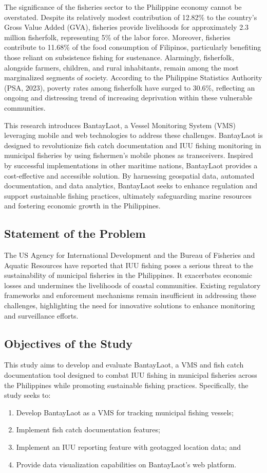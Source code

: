 \documentclass[journal]{IEEEtran}
\begin{document}
The significance of the fisheries sector to the Philippine economy cannot be overstated. Despite its relatively modest contribution of 12.82\% to the country's Gross Value Added (GVA), fisheries provide livelihoods for approximately 2.3 million fisherfolk, representing 5\% of the labor force. Moreover, fisheries contribute to 11.68\% of the food consumption of Filipinos, particularly benefiting those reliant on subsistence fishing for sustenance. Alarmingly, fisherfolk, alongside farmers, children, and rural inhabitants, remain among the most marginalized segments of society. According to the Philippine Statistics Authority (PSA, 2023), poverty rates among fisherfolk have surged to 30.6\%, reflecting an ongoing and distressing trend of increasing deprivation within these vulnerable communities.

This research introduces BantayLaot, a Vessel Monitoring System (VMS) leveraging mobile and web technologies to address these challenges. BantayLaot is designed to revolutionize fish catch documentation and IUU fishing monitoring in municipal fisheries by using fishermen's mobile phones as transceivers. Inspired by successful implementations in other maritime nations, BantayLaot provides a cost-effective and accessible solution. By harnessing geospatial data, automated documentation, and data analytics, BantayLaot seeks to enhance regulation and support sustainable fishing practices, ultimately safeguarding marine resources and fostering economic growth in the Philippines.


\subsection{Statement of the Problem}
The US Agency for International Development and the Bureau of Fisheries and Aquatic Resources have reported that IUU fishing poses a serious threat to the sustainability of municipal fisheries in the Philippines. It exacerbates economic losses and undermines the livelihoods of coastal communities. Existing regulatory frameworks and enforcement mechanisms remain insufficient in addressing these challenges, highlighting the need for innovative solutions to enhance monitoring and surveillance efforts.

\subsection{Objectives of the Study}
This study aims to develop and evaluate BantayLaot, a VMS and fish catch documentation tool designed to combat IUU fishing in municipal fisheries across the Philippines while promoting sustainable fishing practices. Specifically, the study seeks to:
\begin{enumerate}
    \item Develop BantayLaot as a VMS for tracking municipal fishing vessels;
    \item Implement fish catch documentation features;
    \item Implement an IUU reporting feature with geotagged location data; and
    \item Provide data visualization capabilities on BantayLaot's web platform.
\end{enumerate}
\end{document}
